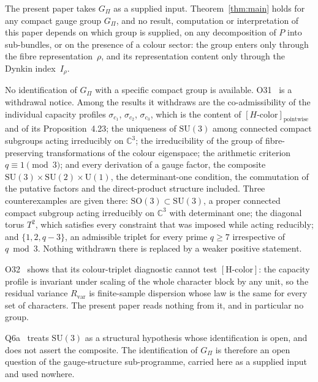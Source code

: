 \documentclass[12pt,a4paper]{article}
\theoremstyle{remark}
\theoremstyle{plain}
\theoremstyle{definition}
\begin{document}
      The present paper takes $G_\Pi$ as a supplied input.
      Theorem~\ref{thm:main} holds for any compact gauge group $G_\Pi$, and no result,
      computation or interpretation of this paper depends on which group is supplied, on any
      decomposition of $P$ into sub-bundles, or on the presence of a colour sector: the group
      enters only through the fibre representation~$\rho$, and its representation content only
      through the Dynkin index~$I_\rho$.

      No identification of $G_\Pi$ with a specific compact group is available.
      O31~\cite{Beau2026a35} is a withdrawal notice.
      Among the results it withdraws are the co-admissibility of the individual capacity profiles
      $\sigma_{c_1}$, $\sigma_{c_2}$, $\sigma_{c_3}$, which is the content of
      $[H\text{-color}]_{\mathrm{pointwise}}$ and of its Proposition~4.23; the uniqueness of
      $\mathrm{SU}(3)$ among connected compact subgroups acting irreducibly on
      $\mathbb{C}^3$; the irreducibility of the group of fibre-preserving transformations of
      the colour eigenspace; the arithmetic criterion $q \equiv 1 \pmod 3$; and every
      derivation of a gauge factor, the composite
      $\mathrm{SU}(3) \times \mathrm{SU}(2) \times \mathrm{U}(1)$, the determinant-one
      condition, the commutation of the putative factors and the direct-product structure
      included.
      Three counterexamples are given there: $\mathrm{SO}(3) \subset \mathrm{SU}(3)$, a
      proper connected compact subgroup acting irreducibly on $\mathbb{C}^3$ with determinant
      one; the diagonal torus $T^2$, which satisfies every constraint that was imposed while
      acting reducibly; and $\{1, 2, q-3\}$, an admissible triplet for every prime
      $q \geq 7$ irrespective of $q \bmod 3$.
      Nothing withdrawn there is replaced by a weaker positive statement.

      O32~\cite{Beau2026a36} shows that its colour-triplet diagnostic cannot test
      $[\mathrm{H\text{-}color}]$: the capacity profile is invariant under scaling of the whole
      character block by any unit, so the residual variance $R_{\mathrm{var}}$ is finite-sample
      dispersion whose law is the same for every set of characters.
      The present paper reads nothing from it, and in particular no group.

      Q6a~\cite{Beau2026q6a} treats $\mathrm{SU}(3)$ as a structural hypothesis whose
      identification is open, and does not assert the composite.
      The identification of $G_\Pi$ is therefore an open question of the gauge-structure
      sub-programme, carried here as a supplied input and used nowhere.
\end{document}

